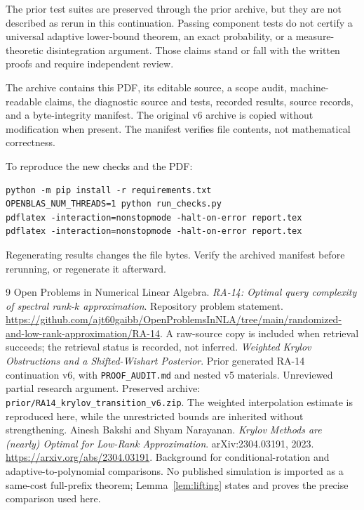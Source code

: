 \documentclass[11pt]{article}
\theoremstyle{definition}
\begin{document}
The prior test suites are preserved through the prior archive, but they are not described as rerun in this continuation. Passing component tests do not certify a universal adaptive lower-bound theorem, an exact probability, or a measure-theoretic disintegration argument. Those claims stand or fall with the written proofs and require independent review.

The archive contains this PDF, its editable source, a scope audit, machine-readable claims, the diagnostic source and tests, recorded results, source records, and a byte-integrity manifest. The original v6 archive is copied without modification when present. The manifest verifies file contents, not mathematical correctness.

To reproduce the new checks and the PDF:
\begin{verbatim}
python -m pip install -r requirements.txt
OPENBLAS_NUM_THREADS=1 python run_checks.py
pdflatex -interaction=nonstopmode -halt-on-error report.tex
pdflatex -interaction=nonstopmode -halt-on-error report.tex
\end{verbatim}
Regenerating results changes the file bytes. Verify the archived manifest before rerunning, or regenerate it afterward.

\begingroup\small\raggedright
\begin{thebibliography}{9}
 Open Problems in Numerical Linear Algebra. \emph{RA-14: Optimal query complexity of spectral rank-$k$ approximation}. Repository problem statement. \url{https://github.com/ajt60gaibb/OpenProblemsInNLA/tree/main/randomized-and-low-rank-approximation/RA-14}. A raw-source copy is included when retrieval succeeds; the retrieval status is recorded, not inferred.
 \emph{Weighted Krylov Obstructions and a Shifted-Wishart Posterior}. Prior generated RA-14 continuation v6, with \texttt{PROOF\_AUDIT.md} and nested v5 materials. Unreviewed partial research argument. Preserved archive: \texttt{prior/RA14\_krylov\_transition\_v6.zip}. The weighted interpolation estimate is reproduced here, while the unrestricted bounds are inherited without strengthening.
 Ainesh Bakshi and Shyam Narayanan. \emph{Krylov Methods are (nearly) Optimal for Low-Rank Approximation}. arXiv:2304.03191, 2023. \url{https://arxiv.org/abs/2304.03191}. Background for conditional-rotation and adaptive-to-polynomial comparisons. No published simulation is imported as a same-cost full-prefix theorem; Lemma~\ref{lem:lifting} states and proves the precise comparison used here.
\end{thebibliography}
\endgroup
\end{document}
